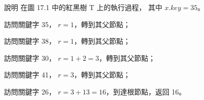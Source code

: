 \startEXERCISE
說明  在圖 17.1 中的紅黑樹 T 上的執行過程，
其中 $x.key = 35$。
\stopEXERCISE

\startANSWER
\startigBase
\item 訪問關鍵字 35， $r=1$，轉到其父節點；
\item 訪問關鍵字 38， $r=1$，轉到其父節點；
\item 訪問關鍵字 30， $r=1+2=3$，轉到其父節點；
\item 訪問關鍵字 41， $r=3$，轉到其父節點；
\item 訪問關鍵字 26， $r=3+13=16$，到達根節點，返回 16。
\stopigBase
\stopANSWER
